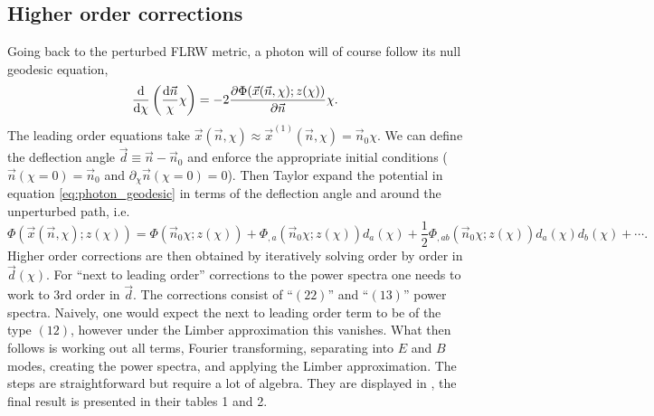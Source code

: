 \documentclass[11pt]{book}
\DeclareRobustCommand{\d}{\ifmmode\text{d}\else d\fi}
\newcommand{\br}[1]{\ensuremath{\left( #1 \right)}}
\begin{document}
\subsection{Higher order corrections}
Going back to the perturbed FLRW metric, a photon will of course follow its null geodesic equation,
\begin{equation}
	\frac{\d }{\d\chi}\br{\frac{\d\vec n}{\chi}\chi}=-2\frac{\partial \Phi(\vec x(\vec n, \chi);z(\chi))}{\partial\vec n}\chi. \label{eq:photon_geodesic}
\end{equation}
The leading order equations take $\vec x(\vec n, \chi) \approx\vec x^{(1)}(\vec n, \chi)=\vec n_0 \chi$. We can define the deflection angle $\vec d \equiv \vec n - \vec n_0$ and enforce the appropriate initial conditions ($\vec n(\chi=0)=\vec n_0$ and $\partial_\chi \vec n(\chi = 0)=0$). Then Taylor expand the potential in equation \ref{eq:photon_geodesic} in terms of the deflection angle and around the unperturbed path, i.e.
\begin{equation}
	\Phi(\vec x(\vec n, \chi);z(\chi)) = \Phi(\vec n_0\chi;z(\chi))+\Phi_{,a}(\vec n_0\chi;z(\chi)) d_a(\chi) + \frac{1}{2}\Phi_{,ab}(\vec n_0\chi;z(\chi))d_a(\chi)d_b(\chi) +\cdots.
\end{equation}
Higher order corrections are then obtained by iteratively solving order by order in $\vec d(\chi)$. For ``next to leading order'' corrections to the power spectra one needs to work to 3rd order in $\vec d$. The corrections consist of ``$(22)$'' and ``$(13)$'' power spectra. Naively, one would expect the next to leading order term to be of the type $(12)$, however under the Limber approximation this vanishes. What then follows is working out all terms, Fourier transforming, separating into $E$ and $B$ modes, creating the power spectra, and applying the Limber approximation. The steps are straightforward but require a lot of algebra. They are displayed in \cite{Krause_2010}, the final result is presented in their tables 1 and 2. 
\end{document}
